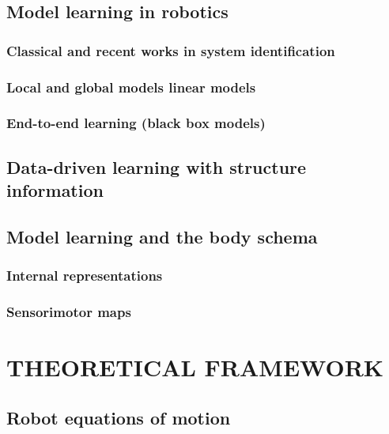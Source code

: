 \documentclass{article}
\begin{document}
\subsection{Model learning in robotics}
\subsubsection{Classical and recent works in system identification}
\subsubsection{Local and global models linear models}
\subsubsection{End-to-end learning (black box models)}
\subsection{Data-driven learning with structure information}
\subsection{Model learning and the body schema}
\subsubsection{Internal representations}
\subsubsection{Sensorimotor maps}

\section{THEORETICAL FRAMEWORK}
\subsection{Robot equations of motion}
\end{document}
